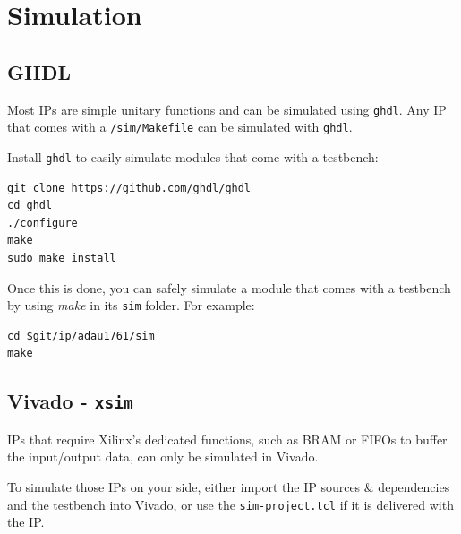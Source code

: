 \documentclass{article}
\begin{document}

\newpage
\section{Simulation}
\subsection{GHDL}

Most IPs are simple unitary functions
and can be simulated using {\tt ghdl}.
Any IP that comes with a {\tt /sim/Makefile}
can be simulated with {\tt ghdl}.

Install {\tt ghdl} to easily
simulate modules that come with a testbench:

\begin{verbatim}
git clone https://github.com/ghdl/ghdl
cd ghdl
./configure
make
sudo make install
\end{verbatim}

Once this is done, you can safely simulate a module
that comes with a testbench by using {\it make}
in its {\tt sim} folder.
For example:

\begin{verbatim}
cd $git/ip/adau1761/sim
make
\end{verbatim}

\subsection{Vivado - {\tt xsim}}

IPs that require Xilinx's dedicated functions,
such as BRAM or FIFOs to buffer the input/output
data, can only be simulated in Vivado.

To simulate those IPs on your side, either
import the IP sources \& dependencies and the testbench
into Vivado, or use the {\tt sim-project.tcl} if
it is delivered with the IP.
\end{document}

